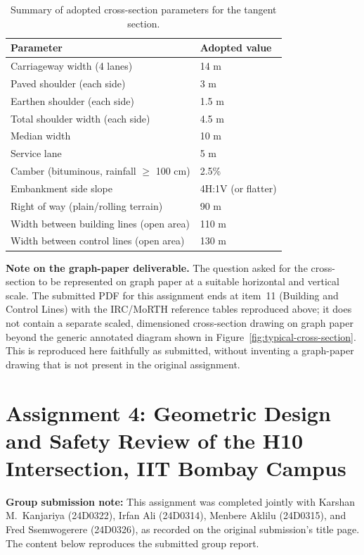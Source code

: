 \documentclass[11pt]{article}
\begin{document}
\begin{table}[H]
  \centering
  \caption{Summary of adopted cross-section parameters for the tangent section.}
  \begin{tabular}{@{}ll@{}}
    \toprule
    \textbf{Parameter} & \textbf{Adopted value} \\
    \midrule
    Carriageway width (4 lanes) & 14 m \\
    Paved shoulder (each side) & 3 m \\
    Earthen shoulder (each side) & 1.5 m \\
    Total shoulder width (each side) & 4.5 m \\
    Median width & 10 m \\
    Service lane & 5 m \\
    Camber (bituminous, rainfall $\geq$ 100 cm) & 2.5\% \\
    Embankment side slope & 4H:1V (or flatter) \\
    Right of way (plain/rolling terrain) & 90 m \\
    Width between building lines (open area) & 110 m \\
    Width between control lines (open area) & 130 m \\
    \bottomrule
  \end{tabular}
\end{table}

\textbf{Note on the graph-paper deliverable.} The question asked for the cross-section to be represented
on graph paper at a suitable horizontal and vertical scale. The submitted PDF for this assignment ends at
item~11 (Building and Control Lines) with the IRC/MoRTH reference tables reproduced above; it does not
contain a separate scaled, dimensioned cross-section drawing on graph paper beyond the generic annotated
diagram shown in Figure~\ref{fig:typical-cross-section}. This is reproduced here faithfully as submitted,
without inventing a graph-paper drawing that is not present in the original assignment.

\clearpage
\section{Assignment 4: Geometric Design and Safety Review of the H10 Intersection, IIT Bombay Campus}

\textbf{Group submission note:} This assignment was completed jointly with Karshan M.\ Kanjariya
(24D0322), Irfan Ali (24D0314), Menbere Aklilu (24D0315), and Fred Ssemwogerere (24D0326), as recorded on
the original submission's title page. The content below reproduces the submitted group report.
\end{document}
